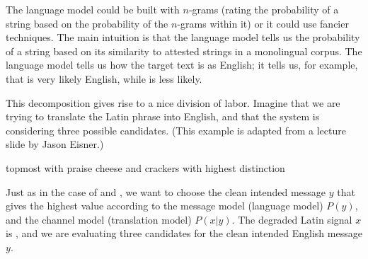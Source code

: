 The language model could be built with $n$-grams (rating the probability of a string based on the probability of the $n$-grams within it)  or it could use fancier techniques.   The main intuition is that the language model tells us the probability of a string based on its similarity to attested strings in a monolingual corpus.   The language model tells us how  the target text is as English; it tells us, for example, that  is very likely English, while  is less likely.


This decomposition gives rise to a nice division of labor.  Imagine
that we are trying to translate the Latin phrase  into English, and that the system is considering three
possible candidates.
	(This example is adapted from a lecture slide by Jason Eisner.)
	
	

\ea \ea \label{latin:topmost} topmost with praise
    \ex \label{latin:cheese} cheese and crackers
	\ex  \label{latin:distinction} with highest distinction
\z 
\z 

Just as in the case of  and , we want to choose the clean intended message $y$ that gives the highest value according to the message model (language model) $P(y)$, and the channel model (translation model) $P(x | y)$.  The degraded Latin signal $x$ is , and we are evaluating three candidates for the clean intended English message $y$.

